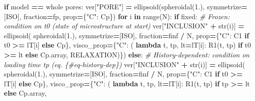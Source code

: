 \documentclass[
  a4paper,
  numbers=noendperiod,
  DIV=12]{scrreprt}
\newenvironment{Shaded}{\begin{snugshade}}{\end{snugshade}}
\newcommand{\BuiltInTok}[1]{#1}
\newcommand{\CommentTok}[1]{\textcolor[rgb]{0.56,0.35,0.01}{\textit{#1}}}
\newcommand{\ControlFlowTok}[1]{\textcolor[rgb]{0.13,0.29,0.53}{\textbf{#1}}}
\newcommand{\FloatTok}[1]{\textcolor[rgb]{0.00,0.00,0.81}{#1}}
\newcommand{\KeywordTok}[1]{\textcolor[rgb]{0.13,0.29,0.53}{\textbf{#1}}}
\newcommand{\NormalTok}[1]{#1}
\newcommand{\OperatorTok}[1]{\textcolor[rgb]{0.81,0.36,0.00}{\textbf{#1}}}
\newcommand{\StringTok}[1]{\textcolor[rgb]{0.31,0.60,0.02}{#1}}
\begin{document}
\begin{Shaded}
\begin{Highlighting}[]
    \ControlFlowTok{if}\NormalTok{ model }\OperatorTok{==} \StringTok{\textquotesingle{}whole pores\textquotesingle{}}\NormalTok{:}
\NormalTok{        ver[}\StringTok{"PORE"}\NormalTok{] }\OperatorTok{=}\NormalTok{ ellipsoid(spheroidal(}\FloatTok{1.}\NormalTok{), symmetrize}\OperatorTok{=}\NormalTok{[ISO],}
\NormalTok{                                fraction}\OperatorTok{=}\NormalTok{fp, prop}\OperatorTok{=}\NormalTok{\{}\StringTok{"C"}\NormalTok{: Cp\})}
        \ControlFlowTok{for}\NormalTok{ i }\KeywordTok{in} \BuiltInTok{range}\NormalTok{(N):}
            \ControlFlowTok{if}\NormalTok{ fixed:}
                \CommentTok{\# Frozen: condition on t0 (state of microstructure at start)}
\NormalTok{                ver[}\StringTok{"INCLUSION"} \OperatorTok{+} \BuiltInTok{str}\NormalTok{(i)] }\OperatorTok{=}\NormalTok{ ellipsoid(}
\NormalTok{                    spheroidal(}\FloatTok{1.}\NormalTok{), symmetrize}\OperatorTok{=}\NormalTok{[ISO], fraction}\OperatorTok{=}\NormalTok{finf }\OperatorTok{/}\NormalTok{ N,}
\NormalTok{                    prop}\OperatorTok{=}\NormalTok{\{}\StringTok{"C"}\NormalTok{: C1 }\ControlFlowTok{if}\NormalTok{ t0 }\OperatorTok{\textgreater{}=}\NormalTok{ lT[i] }\ControlFlowTok{else}\NormalTok{ Cp\},}
\NormalTok{                    visco\_prop}\OperatorTok{=}\NormalTok{\{}\StringTok{"C"}\NormalTok{: (}
                        \KeywordTok{lambda}\NormalTok{ t, tp, lt}\OperatorTok{=}\NormalTok{lT[i]: R1(t, tp) }\ControlFlowTok{if}\NormalTok{ t0 }\OperatorTok{\textgreater{}=}\NormalTok{ lt }\ControlFlowTok{else}\NormalTok{ Cp.array,}
\NormalTok{                        RELAXATION)\})}
            \ControlFlowTok{else}\NormalTok{:}
                \CommentTok{\# History{-}dependent: condition on loading time tp (eq. \{\#eq{-}history{-}dep\})}
\NormalTok{                ver[}\StringTok{"INCLUSION"} \OperatorTok{+} \BuiltInTok{str}\NormalTok{(i)] }\OperatorTok{=}\NormalTok{ ellipsoid(}
\NormalTok{                    spheroidal(}\FloatTok{1.}\NormalTok{), symmetrize}\OperatorTok{=}\NormalTok{[ISO], fraction}\OperatorTok{=}\NormalTok{finf }\OperatorTok{/}\NormalTok{ N,}
\NormalTok{                    prop}\OperatorTok{=}\NormalTok{\{}\StringTok{"C"}\NormalTok{: C1 }\ControlFlowTok{if}\NormalTok{ t0 }\OperatorTok{\textgreater{}=}\NormalTok{ lT[i] }\ControlFlowTok{else}\NormalTok{ Cp\},}
\NormalTok{                    visco\_prop}\OperatorTok{=}\NormalTok{\{}\StringTok{"C"}\NormalTok{: (}
                        \KeywordTok{lambda}\NormalTok{ t, tp, lt}\OperatorTok{=}\NormalTok{lT[i]: R1(t, tp) }\ControlFlowTok{if}\NormalTok{ tp }\OperatorTok{\textgreater{}=}\NormalTok{ lt }\ControlFlowTok{else}\NormalTok{ Cp.array,}

\end{Highlighting}
\end{Shaded}
\end{document}
